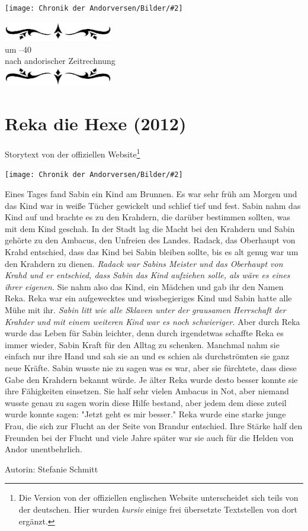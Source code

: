 \documentclass[10pt, a4paper, oneside]{book}
\newcommand{\fillbreak}{\vspace*{\fill}\columnbreak}
\newcommand{\storytext}[1]{%
    \section{#1}%
    \label{Storytext: #1}%
}
\newcommand{\bildmitts}[2][height=0.32\textwidth,width=0.48\textwidth,keepaspectratio]{%
    \begin{center}
        \texttt{[image: Chronik der Andorversen/Bilder/\#2]}
    \end{center}
}
\newcommand{\az}[1]{%
    \begin{center}
        \includegraphics[width=180px]{Chronik der Andorversen/verzierung1.png}\\
        {\Huge #1} \\
        {nach andorischer Zeitrechnung}\\
        \includegraphics[width=180px]{Chronik der Andorversen/verzierung2.png}
    \end{center}
    \extramarks{}{#1 a.Z.}
}
\begin{document}
\begin{multicols}{2}
\begin{chapterbox}
    \bildmitts[width=\textwidth]{Brandur gegen Tarok.jpeg}
    
\end{chapterbox}


\fillbreak
\az{um –40}
\storytext{Reka die Hexe (2012)}

\begin{center}
    Storytext von der offiziellen Website\footnote{Die Version von der offiziellen englischen Website unterscheidet sich teils von der deutschen. Hier wurden \textit{kursiv} einige frei übersetzte Textstellen von dort ergänzt.}
\end{center}

\bildmitts[width=0.15\textwidth]{Reka die Hexe Bild 1.jpg}

Eines Tages fand Sabin ein Kind am Brunnen. Es war sehr früh am Morgen und das Kind war in weiße Tücher gewickelt und schlief tief und fest. Sabin nahm das Kind auf und brachte es zu den Krahdern, die darüber bestimmen sollten, was mit dem Kind geschah. In der Stadt lag die Macht bei den Krahdern und Sabin gehörte zu den Ambacus, den Unfreien des Landes. Radack, das Oberhaupt von Krahd entschied, dass das Kind bei Sabin bleiben sollte, bis es alt genug war um den Krahdern zu dienen. \textit{Radack war Sabins Meister und das Oberhaupt von Krahd und er entschied, dass Sabin das Kind aufziehen solle, als wäre es eines ihrer eigenen.} Sie nahm also das Kind, ein Mädchen und gab ihr den Namen Reka. Reka war ein aufgewecktes und wissbegieriges Kind und Sabin hatte alle Mühe mit ihr. \textit{Sabin litt wie alle Sklaven unter der grausamen Herrschaft der Krahder und mit einem weiteren Kind war es noch schwieriger.} Aber durch Reka wurde das Leben für Sabin leichter, denn durch irgendetwas schaffte Reka es immer wieder, Sabin Kraft für den Alltag zu schenken. Manchmal nahm sie einfach nur ihre Hand und sah sie an und es schien als durchströmten sie ganz neue Kräfte. Sabin wusste nie zu sagen was es war, aber sie fürchtete, dass diese Gabe den Krahdern bekannt würde. Je älter Reka wurde desto besser konnte sie ihre Fähigkeiten einsetzen. Sie half sehr vielen Ambacus in Not, aber niemand wusste genau zu sagen worin diese Hilfe bestand, aber jedem dem diese zuteil wurde konnte sagen: "Jetzt geht es mir besser." Reka wurde eine starke junge Frau, die sich zur Flucht an der Seite von Brandur entschied. Ihre Stärke half den Freunden bei der Flucht und viele Jahre später war sie auch für die Helden von Andor unentbehrlich.\bigskip

Autorin: Stefanie Schmitt


\end{multicols}
\end{document}
